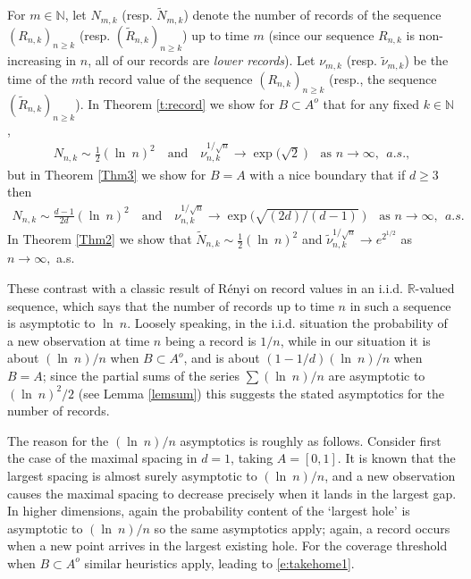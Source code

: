 \documentclass[12pt]{article}
\newcommand{\N}{\mathbb{N}}
\newcommand{\tN}{{\tilde{N}}}
\newcommand{\tnu}{{\tilde{\nu}}}
\newcommand{\tR}{{\tilde{R}}}
\newcommand{\R}{\mathbb{R}}
\renewcommand{\log}{{\ln \:}}
\begin{document}
For $m \in \N$, let $N_{m,k}$ (resp. $\tN_{m,k}$) denote the number of
records of the sequence $(R_{n,k})_{n \geq k}$
(resp. $(\tR_{n,k})_{n \geq k}$) up to time $m$
(since our sequence
$R_{n,k}$ is non-increasing in $n$, all of our records are {\em lower records}).
    Let $\nu_{m,k}$ (resp. $\tilde{\nu}_{m,k}$) be the time of the  
$m$th record value of the sequence $(R_{n,k})_{n \geq k}$ 
(resp.,  the sequence 
$(\tR_{n,k})_{n \geq k}$). 
In Theorem \ref{t:record} we show for $B \subset A^o$
that for any fixed $k \in \N$, 
\begin{align}
N_{n,k} \sim \frac12 (\log n)^2 ~~~ \mbox{ and } ~~~
	\nu_{n,k}^{1/\sqrt{n}} \to \exp \big( \sqrt{2} \:
	\big) ~~~ \mbox{  as } n \to \infty, ~~ a.s.,
	\label{e:takehome1}
\end{align}
but in Theorem \ref{Thm3} we show for $B=A$ with a nice boundary
that if $d \geq 3 $ then
\begin{align}
N_{n,k} \sim \frac{d-1}{2 d} (\log n)^2 ~~~ \mbox{ and } ~~~
	\nu_{n,k}^{1/\sqrt{n}} \to \exp \big(\sqrt{(2d)/(d-1)}\: \big) ~~~ \mbox{  as } n \to \infty, ~~ a.s.
\label{e:takehome2}
\end{align}
In Theorem \ref{Thm2} we show 
that $\tN_{n,k} \sim \frac12 (\log n)^2$ and
$\tnu_{n,k}^{1/\sqrt{n}} \to e^{2^{1/2}} $  as $ n \to \infty,$
a.s.



These contrast  with a classic result of R\'{e}nyi \cite{Renyi}
on record values in an i.i.d. $\R$-valued sequence, which says that
the number of records up to time $n$ 
in such a sequence is asymptotic to $\log n$.
Loosely speaking, in the i.i.d. situation the probability of a new observation
at time $n$ being a record is $1/n$, while in our situation it is about
$(\log n)/n$ when $B \subset A^o$,
and is about $(1-1/d) (\log n)/n$ when $B=A$;
since the partial sums of the series 
$\sum (\log n)/n$ are asymptotic to $(\log n)^2/2$ (see Lemma 
\ref{lemsum})  this suggests the stated asymptotics for the
number of records.


The reason for the $(\log n)/n$ asymptotics is roughly
as follows. Consider first the 
case of the maximal spacing in $d=1$, taking $A=[0,1]$. It is known
\cite{Slud} that the
largest spacing is almost surely asymptotic to $(\log n)/n$,
and a new observation causes the maximal spacing to decrease precisely when it
lands in the largest gap. 
In higher dimensions, again the probability content of the `largest hole'
is asymptotic to $(\log n)/n$ \cite{Deheuvels,MPCov}
so the same asymptotics apply; again, a record occurs when a new point arrives in the largest existing hole. For the
coverage threshold when $B \subset A^o$ similar heuristics apply, leading to
 \eqref{e:takehome1}.
\end{document}
